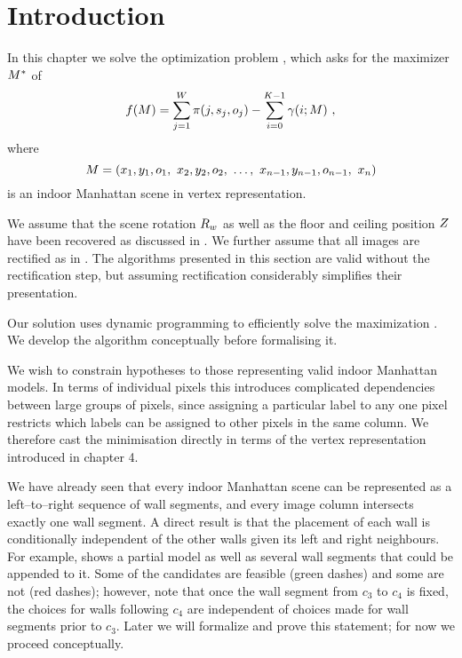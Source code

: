 \newcommand\SubProbIN{\Objective_{in}}
\newcommand\SubProbOUT{\Objective_{out}}
\newcommand\SubProbUP{\Objective_{up}}
\newcommand\SubProbDOWN{\Objective_{down}}

\section{Introduction}

In this chapter we solve the optimization problem ,
which asks for the maximizer $\OptimalScene$ of
\begin{equation}
  \Objective(\Scene) =
    \sum_{j=1}^{\Width} \PixelPayoff(j,\seam_j,\WallOrient_j) -
    \sum_{i=0}^{\NumWalls-1} \CornerPenalty(i;\Scene) ~,
\end{equation}
where
\begin{equation}
  \Scene =
  ( x_1,y_1,\WallOrient_1,
   ~x_2,y_2,\WallOrient_2,
   ~\ldots,
   ~x_{n-1},y_{n-1},\WallOrient_{n-1}, ~x_n )
\end{equation}
is an indoor Manhattan scene in vertex representation.

We assume that the scene rotation $\SceneR$ as well as the floor and
ceiling position $\Zs$ have been recovered as discussed in
. We further assume that all images are rectified
as in . The algorithms presented in this section
are valid without the rectification step, but assuming rectification
considerably simplifies their presentation.

Our solution uses dynamic programming to efficiently solve the
maximization . We develop the algorithm conceptually
before formalising it.

We wish to constrain hypotheses to those representing valid indoor
Manhattan models. In terms of individual pixels this introduces
complicated dependencies between large groups of pixels, since
assigning a particular label to any one pixel restricts which labels
can be assigned to other pixels in the same column. We therefore cast
the minimisation directly in terms of the vertex representation
introduced in chapter 4.

We have already seen that every indoor Manhattan scene can be
represented as a left--to--right sequence of wall segments, and every
image column intersects exactly one wall segment. A direct result is
that the placement of each wall is conditionally independent of the
other walls given its left and right neighbours. For example,
 shows a partial model as well as several wall
segments that could be appended to it. Some of the candidates are
feasible (green dashes) and some are not (red dashes); however, note
that once the wall segment from $c_3$ to $c_4$ is fixed, the choices
for walls following $c_4$ are independent of choices made for wall
segments prior to $c_3$. Later we will formalize and prove this
statement; for now we proceed conceptually.

